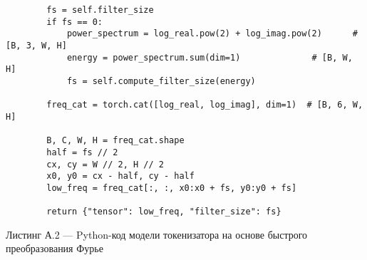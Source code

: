 {\begin{verbatim}
        fs = self.filter_size
        if fs == 0:
            power_spectrum = log_real.pow(2) + log_imag.pow(2)      # [B, 3, W, H]
            energy = power_spectrum.sum(dim=1)              # [B, W, H]
            fs = self.compute_filter_size(energy)

        freq_cat = torch.cat([log_real, log_imag], dim=1)  # [B, 6, W, H]

        B, C, W, H = freq_cat.shape
        half = fs // 2
        cx, cy = W // 2, H // 2
        x0, y0 = cx - half, cy - half
        low_freq = freq_cat[:, :, x0:x0 + fs, y0:y0 + fs]

        return {"tensor": low_freq, "filter_size": fs}

\end{verbatim}
}

\noindent Листинг А.2 — Python-код модели токенизатора на основе быстрого преобразования Фурье

